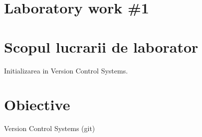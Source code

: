 \section*{Laboratory work \#1}

\section{Scopul lucrarii de laborator}
Initializarea in Version Control Systems.
\section{Obiective}

Version Control Systems (git)
